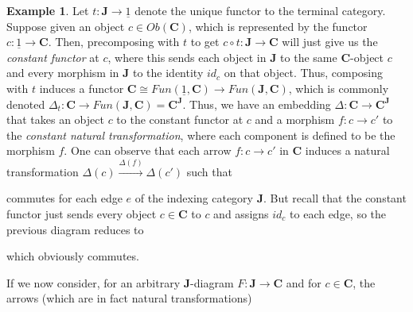 \documentclass[11pt]{book}
\theoremstyle{definition}
\newtheorem{example}{Example}[section]
\theoremstyle{definition}
\theoremstyle{definition}
\theoremstyle{theorem}
\theoremstyle{definition}
\begin{document}
\begin{example}
	Let $t: \textbf{J} \rightarrow \underline{1}$ denote the unique functor to the terminal category. Suppose given an object $c \in Ob(\textbf{C})$, which is represented by the functor $c: \underline{1} \rightarrow \textbf{C}$. Then, precomposing with $t$ to get $c \circ t: \textbf{J} \rightarrow \textbf{C}$ will just give us the \textit{constant functor} at $c$, where this sends each object in \textbf{J} to the same \textbf{C}-object $c$ and every morphism in \textbf{J} to the identity $id_c$ on that object. Thus, composing with $t$ induces a functor $\textbf{C} \cong Fun(\underline{1}, \textbf{C}) \rightarrow Fun(\textbf{J}, \textbf{C})$, which is commonly denoted $\Delta_t: \textbf{C} \rightarrow Fun(\textbf{J}, \textbf{C}) = \textbf{C}^{\textbf{J}}$. Thus, we have an embedding $\Delta: \textbf{C} \rightarrow \textbf{C}^{\textbf{J}}$ that takes an object $c$ to the constant functor at $c$ and a morphism $f: c \rightarrow c'$ to the \textit{constant natural transformation}, where each component is defined to be the morphism $f$. One can observe that each arrow $f: c \rightarrow c'$ in \textbf{C} induces a natural transformation $\Delta(c) \xrightarrow{\Delta(f)} \Delta(c')$ such that 
	\begin{center} 
	\end{center} \par \noindent 
	commutes for each edge $e$ of the indexing category $\textbf{J}$. But recall that the constant functor just sends every object $c \in \textbf{C}$ to $c$ and assigns $id_c$ to each edge, so the previous diagram reduces to 
	\begin{center} 
	\end{center} \par \noindent 
	which obviously commutes. \par 
	If we now consider, for an arbitrary $\textbf{J}$-diagram $F: \textbf{J} \rightarrow \textbf{C}$ and for $c \in \textbf{C}$, the arrows (which are in fact natural transformations)

\end{example}
\end{document}
